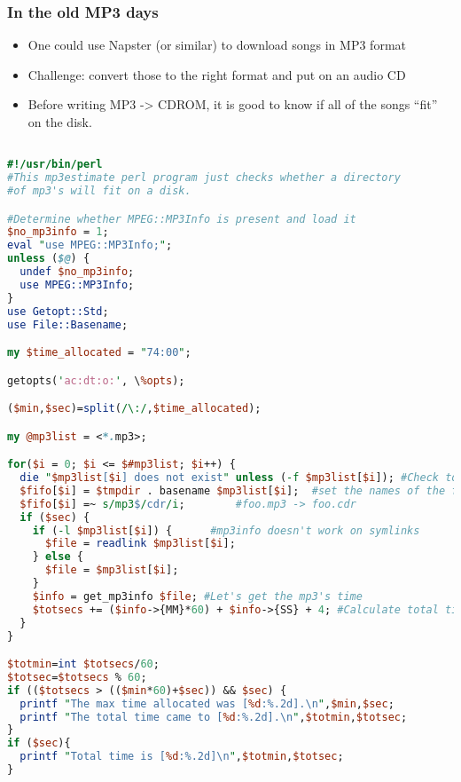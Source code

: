 \documentclass[English]{beamer}
\begin{document}
\begin{frame}
  \frametitle{In the old MP3 days}

  \begin{itemize}
  \item One could use Napster (or similar) to download songs in MP3
    format
  \item Challenge: convert those to the right format and put on an
    audio CD
  \item Before writing MP3 -> CDROM, it is good to know if all of the
    songs ``fit'' on the disk.
  \end{itemize}

\begin{lstlisting}[basicstyle={\tiny},breaklines=true,language=Perl] 

#!/usr/bin/perl
#This mp3estimate perl program just checks whether a directory
#of mp3's will fit on a disk.

#Determine whether MPEG::MP3Info is present and load it
$no_mp3info = 1;
eval "use MPEG::MP3Info;";
unless ($@) {
  undef $no_mp3info;
  use MPEG::MP3Info;
}
use Getopt::Std;
use File::Basename;

my $time_allocated = "74:00";

getopts('ac:dt:o:', \%opts);

($min,$sec)=split(/\:/,$time_allocated);

my @mp3list = <*.mp3>;

for($i = 0; $i <= $#mp3list; $i++) {		
  die "$mp3list[$i] does not exist" unless (-f $mp3list[$i]); #Check to see if file exists
  $fifo[$i] = $tmpdir . basename $mp3list[$i];	#set the names of the fifos
  $fifo[$i] =~ s/mp3$/cdr/i;		#foo.mp3 -> foo.cdr
  if ($sec) {	
    if (-l $mp3list[$i]) {		#mp3info doesn't work on symlinks
      $file = readlink $mp3list[$i];
    } else {
      $file = $mp3list[$i];
    }
    $info = get_mp3info $file; #Let's get the mp3's time
    $totsecs += ($info->{MM}*60) + $info->{SS} + 4; #Calculate total time adding a fudge factor of 4 secs
  }
}

$totmin=int $totsecs/60;
$totsec=$totsecs % 60;
if (($totsecs > (($min*60)+$sec)) && $sec) {
  printf "The max time allocated was [%d:%.2d].\n",$min,$sec;
  printf "The total time came to [%d:%.2d].\n",$totmin,$totsec;
}
if ($sec){
  printf "Total time is [%d:%.2d]\n",$totmin,$totsec;
}
\end{lstlisting}



\end{frame}
\end{document}
